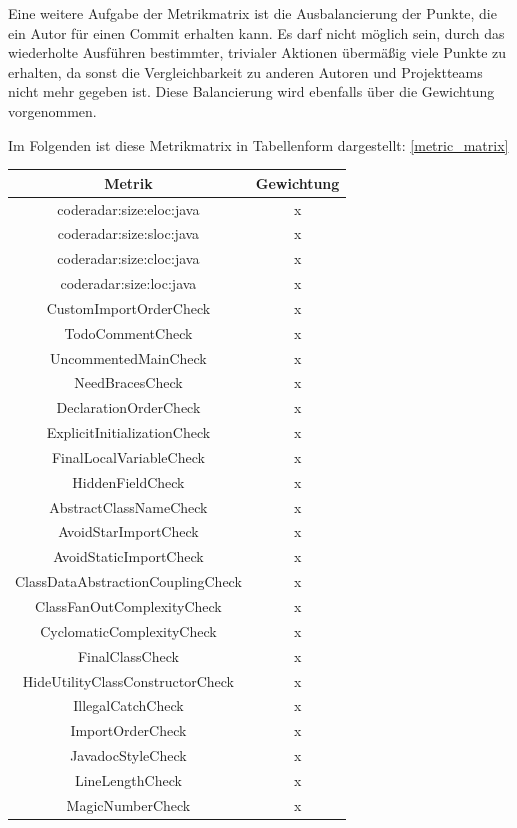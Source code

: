 \documentclass[
	oneside,  %
	ngerman, 
	final, 
	11pt, 
	a4paper, 
	1.1headlines, 
	headinclude=false, 
	footinclude=false, 
	mpinclude=false, 
	pagesize, 
	onecolumn, 
	titlepage, 
	parskip=half, 
	headsepline, 
	chapterprefix=false, 
	version=first, 
	listof=totoc, 
	bibliography=totoc, 
	toc=graduated, 
	fleqn
]{scrbook}
\begin{document}
Eine weitere Aufgabe der Metrikmatrix ist die Ausbalancierung der Punkte, die ein Autor für einen Commit erhalten kann.
Es darf nicht möglich sein, durch das wiederholte Ausführen bestimmter, trivialer Aktionen übermäßig viele Punkte zu erhalten, da sonst die Vergleichbarkeit zu anderen Autoren und Projektteams nicht mehr gegeben ist.
Diese Balancierung wird ebenfalls über die Gewichtung vorgenommen.

Im Folgenden ist diese Metrikmatrix in Tabellenform dargestellt: \ref{metric_matrix}

\label{metric_matrix}
\begin{longtable}{|c|c|}
	\hline
	Metrik & Gewichtung  \\ \hline
	coderadar:size:eloc:java & x \\ \hline
	coderadar:size:sloc:java & x \\ \hline
	coderadar:size:cloc:java & x \\ \hline
	coderadar:size:loc:java & x \\ \hline
	CustomImportOrderCheck & x \\ \hline
	TodoCommentCheck & x \\ \hline
	UncommentedMainCheck & x \\ \hline
	NeedBracesCheck & x \\ \hline
	DeclarationOrderCheck & x \\ \hline
	ExplicitInitializationCheck & x \\ \hline
	FinalLocalVariableCheck & x \\ \hline
	HiddenFieldCheck & x \\ \hline
	AbstractClassNameCheck & x \\ \hline
	AvoidStarImportCheck & x \\ \hline
	AvoidStaticImportCheck & x \\ \hline
	ClassDataAbstractionCouplingCheck & x \\ \hline
	ClassFanOutComplexityCheck & x \\ \hline
	CyclomaticComplexityCheck & x \\ \hline
	FinalClassCheck & x \\ \hline
	HideUtilityClassConstructorCheck & x \\ \hline
	IllegalCatchCheck & x \\ \hline
	ImportOrderCheck & x \\ \hline
	JavadocStyleCheck & x \\ \hline
	LineLengthCheck & x \\ \hline
	MagicNumberCheck & x \\ \hline

\end{longtable}
\end{document}
